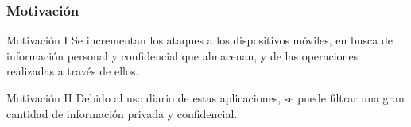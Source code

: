 \begin{frame}
 \frametitle{Motivación}
 \begin{exampleblock}{Motivación I}
Se incrementan los ataques a los dispositivos móviles, en busca de información personal y confidencial que almacenan, y de las operaciones realizadas a través de ellos.
  \end{exampleblock}
  \pause
  \begin{exampleblock}{Motivación II}
Debido al uso diario de estas aplicaciones, se puede filtrar una gran cantidad de información privada y confidencial.
   \end{exampleblock}
\end{frame}



